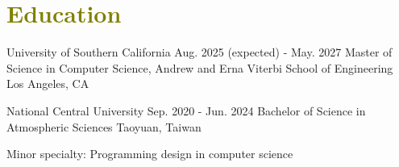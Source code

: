 

\section{\textcolor{olive}{\textbf{Education}}}
	\resumeSubHeadingListStart
		
    \resumeSubheading
        {University of Southern California}
        {Aug. 2025 (expected) - May. 2027}
        {Master of Science in Computer Science, Andrew and Erna Viterbi School of Engineering}
        {\textcolor{gray}{\footnotesize{\faMapMarker}} Los Angeles, CA}

        \resumeItemListStart

        \resumeItemListEnd
		
    \resumeSubheading
        {National Central University}
        {Sep. 2020 - Jun. 2024}
        {Bachelor of Science in Atmospheric Sciences \myScore}
        {\textcolor{gray}{\footnotesize{\faMapMarker}} Taoyuan, Taiwan}
		
    \resumeItemListStart
        \item {
            Minor specialty: Programming design in computer science
        }
    \resumeItemListEnd
		  
	\resumeSubHeadingListEnd
